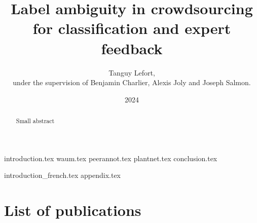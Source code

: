 \documentclass[
a4paper, %
11pt, %
onecolumn, %
openright, %
]{memoir}
\date{2024}
\author{Tanguy Lefort, \\[.5cm] under the supervision of Benjamin Charlier, Alexis Joly and Joseph Salmon.\\[.5cm] }
\title{Label ambiguity in crowdsourcing for classification and expert feedback}
\begin{document}
\frontmatter

\maketitle

\thispagestyle{empty}
\begin{abstract}
Small abstract
\end{abstract}
\clearpage






\clearpage

\begingroup
\setlength\afterchapskip{2cm}

\tableofcontents*
\endgroup
\clearpage

\mainmatter

{introduction.tex}
{waum.tex}
{peerannot.tex}
{plantnet.tex}
{conclusion.tex}

\appendix

{introduction_french.tex}
{appendix.tex}
\backmatter


\chapter*{List of publications}




\end{document}
